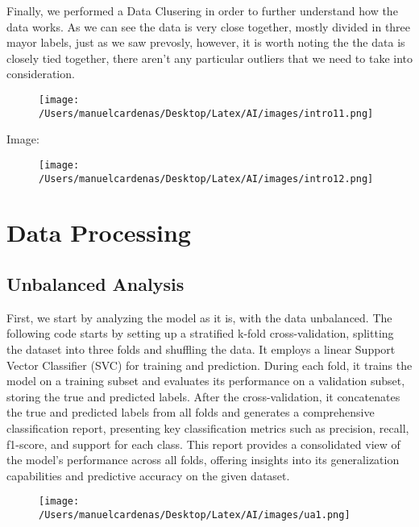 \documentclass{article}
\begin{document}
    Finally, we performed a Data Clusering in order to further understand how the data works.
    As we can see the data is very close together, mostly divided in three mayor labels, just as we saw prevosly, 
    however, it is worth noting the the data is closely tied together, there aren't any particular outliers that we need 
    to take into consideration.
    \begin{figure}[h]
        \centering
        \texttt{[image: /Users/manuelcardenas/Desktop/Latex/AI/images/intro11.png]}
        \label{fig:intro11}
    \end{figure}

    Image:\pagebreak

    \begin{figure}[h]
        \centering
        \texttt{[image: /Users/manuelcardenas/Desktop/Latex/AI/images/intro12.png]}
        \label{fig:intro12}
    \end{figure}

\section{Data Processing}
    \subsection{Unbalanced Analysis}

    First, we start by analyzing the model as it is,  with the data unbalanced. 
    The following code starts by setting up a stratified k-fold cross-validation, splitting the dataset into three folds 
    and shuffling the data. It employs a linear Support Vector Classifier (SVC) for training and prediction. During each fold, 
    it trains the model on a training subset and evaluates its performance on a validation subset, storing the true and 
    predicted labels. After the cross-validation, it concatenates the true and predicted labels from all folds and generates 
    a comprehensive classification report, presenting key classification metrics such as precision, recall, f1-score, and support 
    for each class. This report provides a consolidated view of the model's performance across all folds, offering insights into 
    its generalization capabilities and predictive accuracy on the given dataset. \pagebreak
    \begin{figure}[h]
        \centering
        \texttt{[image: /Users/manuelcardenas/Desktop/Latex/AI/images/ua1.png]}
        \label{fig:ua1}
    \end{figure}
    
\end{document}
